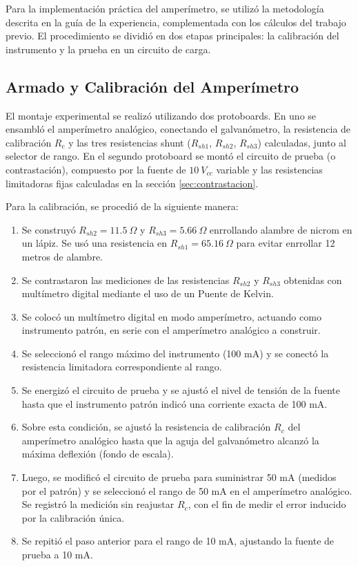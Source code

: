 \label{sec:desarrollo}

Para la implementación práctica del amperímetro, se utilizó la metodología descrita en la guía de la experiencia, complementada con los cálculos del trabajo previo. El procedimiento se dividió en dos etapas principales: la calibración del instrumento y la prueba en un circuito de carga.

\subsection{Armado y Calibración del Amperímetro}

El montaje experimental se realizó utilizando dos protoboards. En uno se ensambló el amperímetro analógico, conectando el galvanómetro, la resistencia de calibración $R_c$ y las tres resistencias shunt ($R_{sh1}$, $R_{sh2}$, $R_{sh3}$) calculadas, junto al selector de rango. En el segundo protoboard se montó el circuito de prueba (o contrastación), compuesto por la fuente de $10~V_{cc}$ variable y las resistencias limitadoras fijas calculadas en la sección \ref{sec:contrastacion}.

Para la calibración, se procedió de la siguiente manera:
\begin{enumerate}
    \item Se construyó $R_{sh2} = 11.5~\Omega$ y $R_{sh3} = 5.66~\Omega$ enrrollando alambre de nicrom en un lápiz. Se usó una resistencia en $R_{sh1} = 65.16~\Omega$ para evitar enrrollar 12 metros de alambre.
    \item Se contrastaron las mediciones de las resistencias $R_{sh2}$ y $R_{sh3}$ obtenidas con multímetro digital mediante el uso de un Puente de Kelvin.
    \item Se colocó un multímetro digital en modo amperímetro, actuando como instrumento patrón, en serie con el amperímetro analógico a construir.
    \item Se seleccionó el rango máximo del instrumento (100 mA) y se conectó la resistencia limitadora correspondiente al rango.
    \item Se energizó el circuito de prueba y se ajustó el nivel de tensión de la fuente hasta que el instrumento patrón indicó una corriente exacta de 100 mA.
    \item Sobre esta condición, se ajustó la resistencia de calibración $R_c$ del amperímetro analógico hasta que la aguja del galvanómetro alcanzó la máxima deflexión (fondo de escala).
    \item Luego, se modificó el circuito de prueba para suministrar 50 mA (medidos por el patrón) y se seleccionó el rango de 50 mA en el amperímetro analógico. Se registró la medición sin reajustar $R_c$, con el fin de medir el error inducido por la calibración única.
    \item Se repitió el paso anterior para el rango de 10 mA, ajustando la fuente de prueba a 10 mA.
\end{enumerate}

